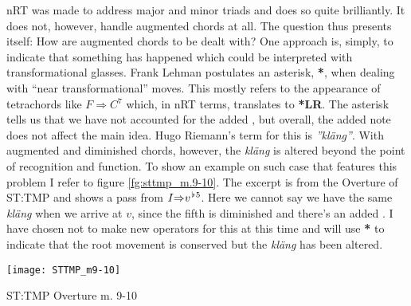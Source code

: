 \ac{nRT} was made to address major and minor triads and does so quite brilliantly. It does not, however, handle augmented chords at all. The question thus presents itself: How are augmented chords to be dealt with? One approach is, simply, to indicate that something has happened which could be interpreted with transformational glasses. Frank Lehman postulates an asterisk, \textbf{*}\parencite{lehman_reading_2012}, when dealing with ``near transformational'' moves. This mostly refers to the appearance of tetrachords like \(F{\Rightarrow}C{^7}\) which, in \ac{nRT} terms, translates to \textbf{*LR}. The asterisk tells us that we have not accounted for the added \textit{}, but overall, the added note does not affect the main idea. Hugo Riemann's term for this is \textit{''kläng''}. With augmented and diminished chords, however, the \textit{kläng} is altered beyond the point of recognition and function. To show an example on such case that features this problem I refer to figure \ref{fg:sttmp_m.9-10}. The excerpt is from the Overture of \ac{ST:TMP} and shows a pass from \({I}{\Rightarrow}{v}^{\hspace*{0.18ex}\flat\hspace*{0.18ex}5}\). Here we cannot say we have the same \textit{kläng} when we arrive at \(v\), since the fifth is diminished and there's an added . I have chosen not to make new operators for this at this time and will use \textbf{*} to indicate that the root movement is conserved but the \textit{kläng} has been altered. 

\begin{marginfigure}[-4cm]
\texttt{[image: STTMP\_m9-10]}
\caption{ST:TMP Overture m. 9-10}
\label{fg:sttmp_m.9-10}
\end{marginfigure}

